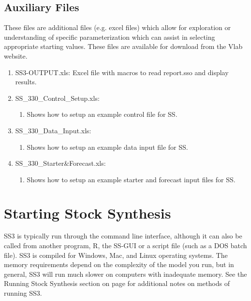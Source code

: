 	\subsection{Auxiliary Files}
	These files are additional files (e.g. excel files) which allow for exploration or understanding of specific parameterization which can assist in selecting appropriate starting values.  These files are available for download from the Vlab website. 
	\begin{enumerate}
		\item SS3-OUTPUT.xls: Excel file with macros to read report.sso and display results.
		\item SS\_330\_Control\_Setup.xls:
		\begin{enumerate}
			\item Shows how to setup an example control file for SS.
		\end{enumerate}
		\item SS\_330\_Data\_Input.xls:
		\begin{enumerate}
			\item Shows how to setup an example data input file for SS.
		\end{enumerate}
		\item SS\_330\_Starter\&Forecast.xls:
		\begin{enumerate}
			\item Shows how to setup an example starter and forecast input files for SS.
		\end{enumerate}

	\end{enumerate}

\pagebreak
		
\section{Starting Stock Synthesis}
SS3 is typically run through the command line interface, although it can also be called from another program, R, the SS-GUI or a script file (such as a DOS batch file). SS3 is compiled for Windows, Mac, and Linux operating systems. The memory requirements depend on the complexity of the model you run, but in general, SS3 will run much slower on computers with inadequate memory. See the Running Stock Synthesis section on page \pageref{sec:RunningSS} for additional notes on methods of running SS3.

